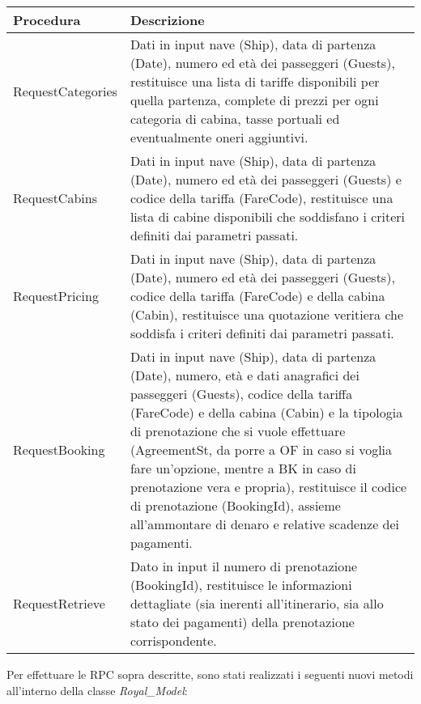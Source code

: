 \begin{center}
	\def\arraystretch{1.5}
	\begin{longtable}{ >{\raggedright}p{5.5cm} p{6.8cm}} 
		\hline
		\textbf{Procedura} & \textbf{Descrizione} \\
		\hline
		RequestCategories & Dati in input nave (Ship), data di partenza (Date), numero ed età dei passeggeri (Guests), restituisce una lista di tariffe disponibili per quella partenza, complete di prezzi per ogni categoria di cabina, tasse portuali ed eventualmente oneri aggiuntivi.\\
		\hline
		RequestCabins &  Dati in input nave (Ship), data di partenza (Date), numero ed età dei passeggeri (Guests) e codice della tariffa (FareCode), restituisce una lista di cabine disponibili che soddisfano i criteri definiti dai parametri passati.\\
		\hline
		RequestPricing &  Dati in input nave (Ship), data di partenza (Date), numero ed età dei passeggeri (Guests), codice della tariffa (FareCode) e della cabina (Cabin), restituisce una quotazione veritiera che soddisfa i criteri definiti dai parametri passati.\\
		\hline
		RequestBooking &  Dati in input nave (Ship), data di partenza (Date), numero, età e dati anagrafici dei passeggeri (Guests), codice della tariffa (FareCode) e della cabina (Cabin) e la tipologia di prenotazione che si vuole effettuare (AgreementSt, da porre a OF in caso si voglia fare un'opzione, mentre a BK in caso di prenotazione vera e propria), restituisce il codice di prenotazione (BookingId), assieme all'ammontare di denaro e relative scadenze dei pagamenti.\\
		\hline
		RequestRetrieve &  Dato in input il numero di prenotazione (BookingId), restituisce le informazioni dettagliate (sia inerenti all'itinerario, sia allo stato dei pagamenti) della prenotazione corrispondente.\\
		\hline
	\end{longtable}
\end{center}
Per effettuare le \gls{RPC} sopra descritte, sono stati realizzati i seguenti nuovi metodi all'interno della classe \textit{Royal\_Model}:
